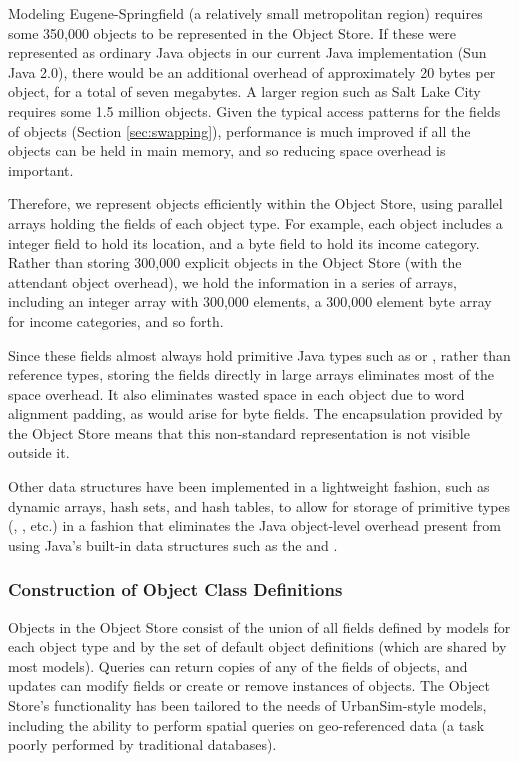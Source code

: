 Modeling Eugene-Springfield (a relatively small metropolitan region)
requires some 350,000 objects to be represented in the
Object Store.  If these were represented as ordinary Java objects in our
current Java implementation (Sun Java 2.0), there would be an additional
overhead of approximately 20 bytes per object, for a total of seven
megabytes.  A larger region such as Salt Lake City requires some 1.5
million objects.  Given the typical access patterns for the fields of
objects (Section \ref{sec:swapping}), performance is much improved if all
the objects can be held in main memory, and so reducing space overhead is
important.

Therefore, we represent objects efficiently within the Object Store, using
parallel arrays holding the fields of each object type.  For example, each
 object includes a integer field to hold its location,
and a byte field to hold its income category.  Rather than
storing 300,000 explicit  objects in the Object Store
(with the attendant object overhead), we hold the information in a series
of arrays, including an integer array  with 300,000
elements, a 300,000 element byte array for income categories, and so forth.

Since these fields almost always hold primitive Java types such as
 or , rather than reference types, storing the
fields directly in large arrays eliminates most of the space overhead.  It
also eliminates wasted space in each object due to word alignment padding,
as would arise for byte fields.  The encapsulation provided by the Object
Store means that this non-standard representation is not visible outside
it.

Other data structures have been implemented in a lightweight fashion, such as
dynamic arrays, hash sets, and hash tables, to allow for storage of primitive
types (, , etc.) in a fashion that eliminates the
Java object-level overhead present from using Java's built-in data
structures such as the  and .

\subsubsection{Construction of Object Class Definitions}
\label{sec:object-definition}

Objects in the Object Store consist of the union of all fields
defined by models for each object type and by the set of default
object definitions (which are shared by most models).  Queries can
return copies of any of the fields of objects, and updates can
modify fields or create or remove instances of objects.  The
Object Store's functionality has been tailored to the needs of
UrbanSim-style models, including the ability to perform spatial
queries on geo-referenced data (a task poorly performed by
traditional databases).

